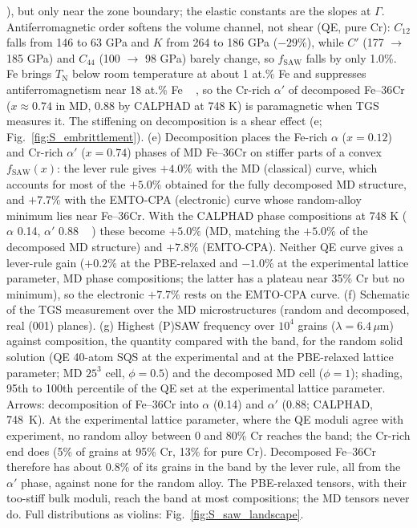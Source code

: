 \documentclass[final,3p,times]{elsarticle}
\begin{document}
{{\cite{shaw1971investigation}}\hskip0pt%
), but only near the zone boundary; the elastic constants are the slopes at $\Gamma$. Antiferromagnetic order softens the volume channel, not shear (QE, pure Cr): $C_{12}$ falls from 146 to 63 GPa and $K$ from 264 to 186 GPa ($-29\%$), while $C'$ (177 $\to$ 185 GPa) and $C_{44}$ (100 $\to$ 98 GPa) barely change, so $f_{\mathrm{SAW}}$ falls by only 1.0\%. Fe brings $T_{\mathrm N}$ below room temperature at about 1 at.\% Fe and suppresses antiferromagnetism near 18 at.\% Fe \mbox{%
\cite{xiong2011improved}}\hskip0pt%
, so the Cr-rich $\alpha'$ of decomposed Fe--36Cr ($x\approx0.74$ in MD, 0.88 by CALPHAD at 748 K) is paramagnetic when TGS measures it. The stiffening on decomposition is a shear effect (e; Fig.~\ref{fig:S_embrittlement}). (e) Decomposition places the Fe-rich $\alpha$ ($x=0.12$) and Cr-rich $\alpha'$ ($x=0.74$) phases of MD Fe--36Cr on stiffer parts of a convex $f_{\mathrm{SAW}}(x)$: the lever rule gives $+4.0\%$ with the MD (classical) curve, which accounts for most of the $+5.0\%$ obtained for the fully decomposed MD structure, and $+7.7\%$ with the EMTO-CPA (electronic) curve whose random-alloy minimum lies near Fe--36Cr. With the CALPHAD phase compositions at 748 K ($\alpha$ 0.14, $\alpha'$ 0.88 \mbox{%
\cite{xiong2011improved}}\hskip0pt%
) these become $+5.0\%$ (MD, matching the $+5.0\%$ of the decomposed MD structure) and $+7.8\%$ (EMTO-CPA). Neither QE curve gives a lever-rule gain ($+0.2\%$ at the PBE-relaxed and $-1.0\%$ at the experimental lattice parameter, MD phase compositions; the latter has a plateau near 35\% Cr but no minimum), so the electronic $+7.7\%$ rests on the EMTO-CPA curve. (f) Schematic of the TGS measurement over the MD microstructures (random and decomposed, real (001) planes). (g) Highest (P)SAW frequency over $10^4$ grains ($\lambda=6.4\,\mu$m) against composition, the quantity compared with the band, for the random solid solution (QE 40-atom SQS at the experimental and at the PBE-relaxed lattice parameter; MD $25^3$ cell, $\phi=0.5$) and the decomposed MD cell ($\phi=1$); shading, 95th to 100th percentile of the QE set at the experimental lattice parameter. Arrows: decomposition of Fe--36Cr into $\alpha$ (0.14) and $\alpha'$ (0.88; CALPHAD, 748~K). At the experimental lattice parameter, where the QE moduli agree with experiment, no random alloy between 0 and 80\% Cr reaches the band; the Cr-rich end does (5\% of grains at 95\% Cr, 13\% for pure Cr). Decomposed Fe--36Cr therefore has about 0.8\% of its grains in the band by the lever rule, all from the $\alpha'$ phase, against none for the random alloy. The PBE-relaxed tensors, with their too-stiff bulk moduli, reach the band at most compositions; the MD tensors never do. Full distributions as violins: Fig.~\ref{fig:S_saw_landscape}.
}\clearpage
\end{document}

